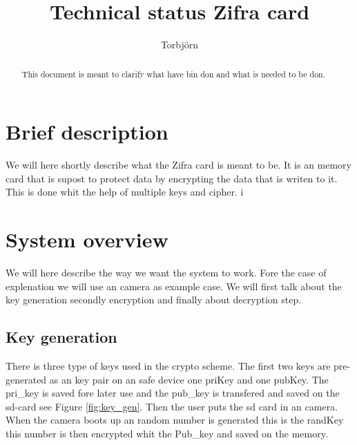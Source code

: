 \documentclass[]{article}
\title{Technical status Zifra card}
\author{Torbjörn}
\begin{document}
\maketitle
\tableofcontents
\newpage
\newpage

\begin{abstract}
This document is meant to clarify what have bin don and what is needed to be don.
\end{abstract}

\newpage







\section{Brief description}
We will here shortly describe what the Zifra card is meant to be.
It is an memory card that is supost to protect data by encrypting the data that is writen to it.
This is done whit the help of multiple \gls{keys} and \gls{cipher}.
i
\section{System overview}
We will here describe the way we want the system to work.
Fore the case of explenation we will use an camera as example case.
We will first talk about the key generation secondly encryption and finally about decryption step.

\subsection{Key generation}
There is three type of keys used in the crypto scheme.
The first two keys are pre-generated as an key pair on an safe device one \acrfull{priKey} and one \acrfull{pubKey}. 
The pri\_key is saved fore later use and the pub\_key is transfered and saved on the sd-card see Figure \ref{fig:key_gen}.
Then the user puts the sd card in an camera.
When the camera boots up an random number is generated this is the \acrfull{randKey} this number is then encrypted whit the Pub\_key and saved on the memory.
\end{document}
